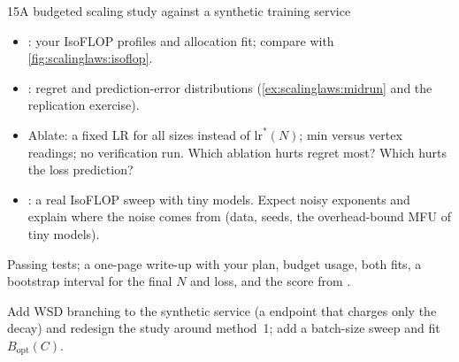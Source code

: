 \begin{labbox}{15}{A budgeted scaling study against a synthetic training service}
\begin{itemize}
\item {}: your IsoFLOP profiles and allocation fit; compare
      with \cref{fig:scalinglaws:isoflop}.
\item {}: regret and prediction-error distributions
      (\cref{ex:scalinglaws:midrun} and the replication exercise).
\item Ablate: a fixed LR for all sizes instead of $\text{lr}^*(N)$; min versus vertex readings;
      no verification run. Which ablation hurts regret most? Which hurts the loss prediction?
\item {}: a real IsoFLOP sweep with tiny models. Expect noisy exponents and
      explain where the noise comes from (data, seeds, the overhead-bound MFU of tiny models).
\end{itemize}

Passing tests; a one-page write-up with your plan, budget usage, both fits, a bootstrap
interval for the final $N$ and loss, and the score from .

Add WSD branching to the synthetic service (a  endpoint that
charges only the decay) and redesign the study around method~1; add a batch-size sweep and fit
$B_{\text{opt}}(C)$.
\end{labbox}
